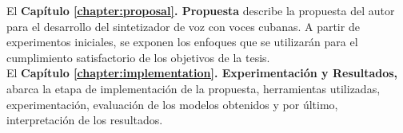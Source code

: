 El \textbf{Capítulo \ref{chapter:proposal}. Propuesta} describe la propuesta del autor para el desarrollo del sintetizador de voz con voces cubanas. A partir de experimentos iniciales, se exponen los enfoques que se utilizarán para el cumplimiento satisfactorio de los objetivos de la tesis.\\

 
El \textbf{Capítulo \ref{chapter:implementation}. Experimentación y Resultados,} abarca la etapa de implementación de la propuesta, herramientas utilizadas, experimentación, evaluación de los modelos obtenidos y por último, interpretación de los resultados.
